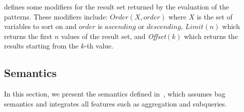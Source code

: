 \squishend
 
 \sparql defines some modifiers for the result set returned by the evaluation of the patterns. These modifiers include: $Order(X,order)$ where $X$ is the set of variables to sort on and $order$ is %
$ascending$ or $descending$, %
$Limit(n)$ which returns the first $n$ values of the result set, and
\textit{Offset}$(k)$
which returns the results starting from the $k$-th value.

\vspace*{-12pt}
\subsection{\sparql Semantics}
\label{subsec:sparql}
In this section, we present the semantics defined in~\cite{kaminski2016semantics}, which assumes bag semantics and integrates all  features such as aggregation and subqueries.



